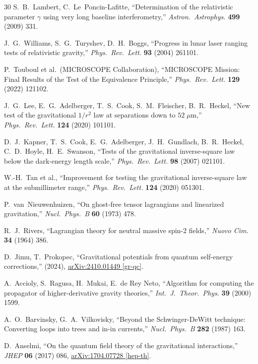\documentclass[11pt,a4paper]{article}
\theoremstyle{plain}
\theoremstyle{definition}
\theoremstyle{remark}
\begin{document}
\begin{thebibliography}{30}
S.~B.~Lambert, C.~Le~Poncin-Lafitte,
``Determination of the relativistic parameter $\gamma$ using very
long baseline interferometry,''
\textit{Astron.\ Astrophys.} \textbf{499} (2009) 331.

J.~G.~Williams, S.~G.~Turyshev, D.~H.~Boggs,
``Progress in lunar laser ranging tests of relativistic gravity,''
\textit{Phys.\ Rev.\ Lett.} \textbf{93} (2004) 261101.

P.~Touboul et al.\ (MICROSCOPE Collaboration),
``MICROSCOPE Mission: Final Results of the Test of the Equivalence
Principle,''
\textit{Phys.\ Rev.\ Lett.} \textbf{129} (2022) 121102.

J.~G.~Lee, E.~G.~Adelberger, T.~S.~Cook, S.~M.~Fleischer,
B.~R.~Heckel,
``New test of the gravitational $1/r^2$ law at separations
down to $52\;\mu$m,''
\textit{Phys.\ Rev.\ Lett.} \textbf{124} (2020) 101101.

D.~J.~Kapner, T.~S.~Cook, E.~G.~Adelberger, J.~H.~Gundlach,
B.~R.~Heckel, C.~D.~Hoyle, H.~E.~Swanson,
``Tests of the gravitational inverse-square law below the
dark-energy length scale,''
\textit{Phys.\ Rev.\ Lett.} \textbf{98} (2007) 021101.

W.-H.~Tan et al.,
``Improvement for testing the gravitational inverse-square law
at the submillimeter range,''
\textit{Phys.\ Rev.\ Lett.} \textbf{124} (2020) 051301.

P.~van~Nieuwenhuizen,
``On ghost-free tensor lagrangians and linearized gravitation,''
\textit{Nucl.\ Phys.\ B} \textbf{60} (1973) 478.

R.~J.~Rivers,
``Lagrangian theory for neutral massive spin-2 fields,''
\textit{Nuovo Cim.} \textbf{34} (1964) 386.

D.~Jimu, T.~Prokopec,
``Gravitational potentials from quantum self-energy corrections,''
(2024),
\href{https://arxiv.org/abs/2410.01449}{arXiv:2410.01449 [gr-qc]}.

A.~Accioly, S.~Ragusa, H.~Mukai, E.~de Rey Neto,
``Algorithm for computing the propagator of higher-derivative
gravity theories,''
\textit{Int.\ J.\ Theor.\ Phys.} \textbf{39} (2000) 1599.

A.~O.~Barvinsky, G.~A.~Vilkovisky,
``Beyond the Schwinger-DeWitt technique: Converting loops into trees
and in-in currents,''
\textit{Nucl.\ Phys.\ B} \textbf{282} (1987) 163.

D.~Anselmi,
``On the quantum field theory of the gravitational interactions,''
\textit{JHEP} \textbf{06} (2017) 086,
\href{https://arxiv.org/abs/1704.07728}{arXiv:1704.07728 [hep-th]}.


\end{thebibliography}
\end{document}
